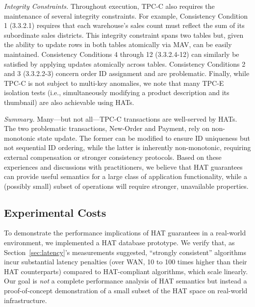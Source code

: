 \vspace{.5em}\noindent\textit{Integrity Constraints.} Throughout execution, TPC-C also requires the maintenance of several
integrity constraints. For example, Consistency Condition 1 (3.3.2.1)
requires that each warehouse's sales count must reflect the sum of its
subordinate sales districts. This integrity constraint spans two
tables but, given the ability to update rows in both tables atomically
via MAV, can be easily maintained. Consistency Conditions 4 through 12
(3.3.2.4-12) can similarly be satisfied by applying updates atomically
across tables. Consistency Conditions 2 and 3 (3.3.2.2-3) concern
order ID assignment and are problematic. Finally, while TPC-C is not
subject to multi-key anomalies, we note that many TPC-E isolation
tests (i.e., simultaneously modifying a product description and its
thumbnail) are also achievable using HATs.

\vspace{.5em}\noindent\textit{Summary.} Many---but not all---TPC-C
transactions are well-served by HATs. The two problematic
transactions, New-Order and Payment, rely on non-monotonic state
update. The former can be modified to ensure ID uniqueness but not
sequential ID ordering, while the latter is inherently non-monotonic,
requiring external compensation or stronger consistency
protocols. Based on these experiences and discussions with
practitioners, we believe that HAT guarantees can provide useful
semantics for a large class of application functionality, while a
(possibly small) subset of operations will require stronger,
unavailable properties.

\subsection{Experimental Costs}
\label{sec:prototype}

To demonstrate the performance implications of HAT guarantees in a
real-world environment, we implemented a HAT database prototype. We
verify that, as Section~\ref{sec:latency}'s measurements suggested,
``strongly consistent'' algorithms incur substantial latency penalties
(over WAN, 10 to 100 times higher than their HAT counterparts)
compared to HAT-compliant algorithms, which scale linearly. Our goal
is \textit{not} a complete performance analysis of HAT semantics but
instead a proof-of-concept demonstration of a small subset of the HAT
space on real-world infrastructure.

